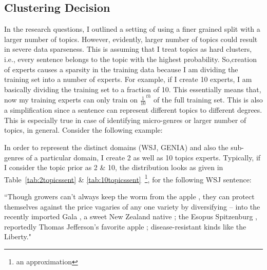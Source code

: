 \subsection{Clustering Decision} 

In the research questions, I outlined a setting of using a finer grained split with a larger number of topics. However, evidently, 
larger number of topics could result in severe data sparseness. This is assuming that I treat topics as hard clusters, i.e., every sentence belongs to the topic with the highest probability. So,creation of experts causes a sparsity in the training data because I am dividing the training set into a number of experts. For example, if I create 10 experts, I am basically dividing the training set to a fraction of 10. This essentially means that, now my training experts can only train on $\frac{1}{10}^{th}$ of the full training set. 
This is also a simplification since a sentence can represent different topics to different degrees. This is especially true in case of identifying micro-genres or larger number of topics, in general.
Consider the following example:

In order to represent the distinct domains (WSJ, GENIA) and also the sub-genres of a particular domain, I create 2 as well as 10 topics experts. Typically, if I consider the topic prior as 2 \& 10, the distribution looks as given in Table~\ref{tab:2topicssent} \& \ref{tab:10topicssent}~\footnote{an approximation}, for the following WSJ sentence:

``Though growers can't always keep the worm from the apple , they can protect themselves against the price vagaries of any one variety by diversifying -- into the recently imported Gala , a sweet New Zealand native ; the Esopus Spitzenburg , reportedly Thomas Jefferson's favorite apple ; disease-resistant kinds like the Liberty."
 
